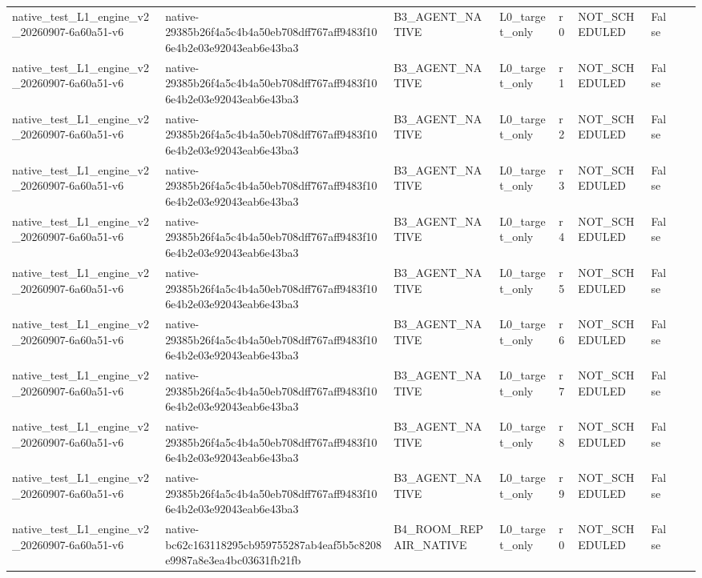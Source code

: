 \begin{tabular}{lllllllll}
native\_test\_L1\_engine\_v2\_20260907-6a60a51-v6 & native-29385b26f4a5c4b4a50eb708dff767aff9483f106e4b2e03e92043eab6e43ba3 & B3\_AGENT\_NATIVE & L0\_target\_only & r0 & NOT\_SCHEDULED & False &  &  \\
native\_test\_L1\_engine\_v2\_20260907-6a60a51-v6 & native-29385b26f4a5c4b4a50eb708dff767aff9483f106e4b2e03e92043eab6e43ba3 & B3\_AGENT\_NATIVE & L0\_target\_only & r1 & NOT\_SCHEDULED & False &  &  \\
native\_test\_L1\_engine\_v2\_20260907-6a60a51-v6 & native-29385b26f4a5c4b4a50eb708dff767aff9483f106e4b2e03e92043eab6e43ba3 & B3\_AGENT\_NATIVE & L0\_target\_only & r2 & NOT\_SCHEDULED & False &  &  \\
native\_test\_L1\_engine\_v2\_20260907-6a60a51-v6 & native-29385b26f4a5c4b4a50eb708dff767aff9483f106e4b2e03e92043eab6e43ba3 & B3\_AGENT\_NATIVE & L0\_target\_only & r3 & NOT\_SCHEDULED & False &  &  \\
native\_test\_L1\_engine\_v2\_20260907-6a60a51-v6 & native-29385b26f4a5c4b4a50eb708dff767aff9483f106e4b2e03e92043eab6e43ba3 & B3\_AGENT\_NATIVE & L0\_target\_only & r4 & NOT\_SCHEDULED & False &  &  \\
native\_test\_L1\_engine\_v2\_20260907-6a60a51-v6 & native-29385b26f4a5c4b4a50eb708dff767aff9483f106e4b2e03e92043eab6e43ba3 & B3\_AGENT\_NATIVE & L0\_target\_only & r5 & NOT\_SCHEDULED & False &  &  \\
native\_test\_L1\_engine\_v2\_20260907-6a60a51-v6 & native-29385b26f4a5c4b4a50eb708dff767aff9483f106e4b2e03e92043eab6e43ba3 & B3\_AGENT\_NATIVE & L0\_target\_only & r6 & NOT\_SCHEDULED & False &  &  \\
native\_test\_L1\_engine\_v2\_20260907-6a60a51-v6 & native-29385b26f4a5c4b4a50eb708dff767aff9483f106e4b2e03e92043eab6e43ba3 & B3\_AGENT\_NATIVE & L0\_target\_only & r7 & NOT\_SCHEDULED & False &  &  \\
native\_test\_L1\_engine\_v2\_20260907-6a60a51-v6 & native-29385b26f4a5c4b4a50eb708dff767aff9483f106e4b2e03e92043eab6e43ba3 & B3\_AGENT\_NATIVE & L0\_target\_only & r8 & NOT\_SCHEDULED & False &  &  \\
native\_test\_L1\_engine\_v2\_20260907-6a60a51-v6 & native-29385b26f4a5c4b4a50eb708dff767aff9483f106e4b2e03e92043eab6e43ba3 & B3\_AGENT\_NATIVE & L0\_target\_only & r9 & NOT\_SCHEDULED & False &  &  \\
native\_test\_L1\_engine\_v2\_20260907-6a60a51-v6 & native-bc62c163118295cb959755287ab4eaf5b5c8208e9987a8e3ea4bc03631fb21fb & B4\_ROOM\_REPAIR\_NATIVE & L0\_target\_only & r0 & NOT\_SCHEDULED & False &  &  \\

\end{tabular}

